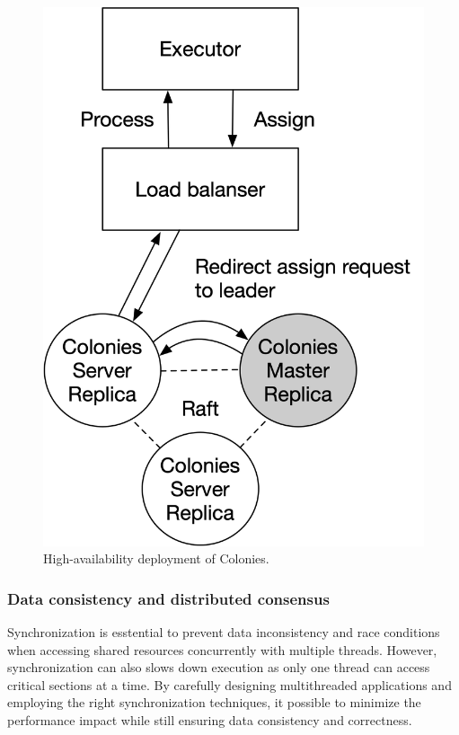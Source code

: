 \documentclass{article}
\begin{document}
\begin{figure}[h]
	\centering
    \includegraphics[scale=0.5]{raft.png}
	\caption{High-availability deployment of Colonies.}
	\label{fig:ha_deployment}
\end{figure}

\subsubsection{Data consistency and distributed consensus}
Synchronization is esstential to prevent data inconsistency and race conditions when accessing shared resources concurrently with multiple threads. However, synchronization can also slows down execution as only one thread can access critical sections at a time. By carefully designing multithreaded applications and employing the right synchronization techniques, it possible to minimize the performance impact while still ensuring data consistency and correctness.  
\end{document}
